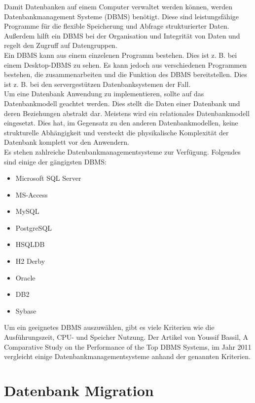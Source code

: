 Damit Datenbanken auf einem Computer verwaltet werden können, werden Datenbankmanagement Systeme (DBMS) benötigt. Diese sind leistungsfähige Programme für die flexible Speicherung und Abfrage strukturierter Daten. \\
Außerdem hilft ein DBMS bei der Organisation und Integrität von Daten und regelt den Zugruff auf Datengruppen. \\
Ein DBMS kann aus einem einzelenen Programm bestehen. Dies ist z. B. bei einem Desktop-DBMS zu sehen. Es kann jedoch aus verschiedenen Programmen bestehen, die zusammenarbeiten und die Funktion des DBMS bereitstellen. Dies ist z. B. bei den servergestützen Datenbanksystemen der Fall.\\
Um eine Datenbank Anwendung zu implementieren, sollte auf das Datenbankmodell geachtet werden. Dies stellt die Daten einer Datenbank und deren Beziehungen abstrakt dar. Meistens wird ein relationales Datenbankmodell eingesetzt. Dies hat, im Gegensatz zu den anderen Datenbankmodellen, keine strukturelle Abhängigkeit und versteckt die physikalische Komplexität der Datenbank komplett vor den Anwendern.\\
Es stehen zahlreiche Datenbankmanagementsysteme zur Verfügung. Folgendes sind einige der gängigsten DBMS:
\begin{itemize}
	\item Microsoft SQL Server
	\item MS-Access
	\item MySQL
	\item PostgreSQL
	\item HSQLDB
	\item H2 Derby
	\item Oracle
	\item DB2
	\item Sybase
\end{itemize}
Um ein geeignetes DBMS auszuwählen, gibt es viele Kriterien wie die Ausführungszeit, CPU- und Speicher Nutzung. Der Artikel von Youssif Bassil, A Comparative Study on the Performance of the Top DBMS Systems, im Jahr 2011 vergleicht einige Datenbankmanagementsysteme anhand der genannten Kriterien.
\section{Datenbank Migration}


